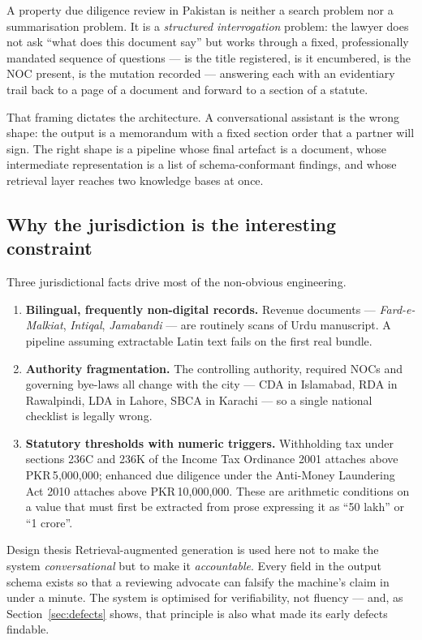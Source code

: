 \documentclass[11pt,a4paper]{article}
\newcommand{\pkr}{PKR\,}
\begin{document}
A property due diligence review in Pakistan is neither a search problem nor a
summarisation problem. It is a \emph{structured interrogation} problem: the lawyer does not
ask ``what does this document say'' but works through a fixed, professionally mandated
sequence of questions --- is the title registered, is it encumbered, is the NOC present, is
the mutation recorded --- answering each with an evidentiary trail back to a page of a
document and forward to a section of a statute.

That framing dictates the architecture. A conversational assistant is the wrong shape: the
output is a memorandum with a fixed section order that a partner will sign. The right shape
is a pipeline whose final artefact is a document, whose intermediate representation is a
list of schema-conformant findings, and whose retrieval layer reaches two knowledge bases
at once.

\subsection{Why the jurisdiction is the interesting constraint}

Three jurisdictional facts drive most of the non-obvious engineering.

\begin{enumerate}
\item \textbf{Bilingual, frequently non-digital records.} Revenue documents ---
\emph{Fard-e-Malkiat}, \emph{Intiqal}, \emph{Jamabandi} --- are routinely scans of Urdu
manuscript. A pipeline assuming extractable Latin text fails on the first real bundle.

\item \textbf{Authority fragmentation.} The controlling authority, required NOCs and
governing bye-laws all change with the city --- CDA in Islamabad, RDA in Rawalpindi, LDA in
Lahore, SBCA in Karachi --- so a single national checklist is legally wrong.

\item \textbf{Statutory thresholds with numeric triggers.} Withholding tax under
sections 236C and 236K of the Income Tax Ordinance 2001 attaches above \pkr 5{,}000{,}000;
enhanced due diligence under the Anti-Money Laundering Act 2010 attaches above
\pkr 10{,}000{,}000. These are arithmetic conditions on a value that must first be
extracted from prose expressing it as ``50 lakh'' or ``1 crore''.
\end{enumerate}

\begin{keybox}{Design thesis}
\small
Retrieval-augmented generation is used here not to make the system \emph{conversational}
but to make it \emph{accountable}. Every field in the output schema exists so that a
reviewing advocate can falsify the machine's claim in under a minute. The system is
optimised for verifiability, not fluency --- and, as Section~\ref{sec:defects} shows,
that principle is also what made its early defects findable.
\end{keybox}
\end{document}
